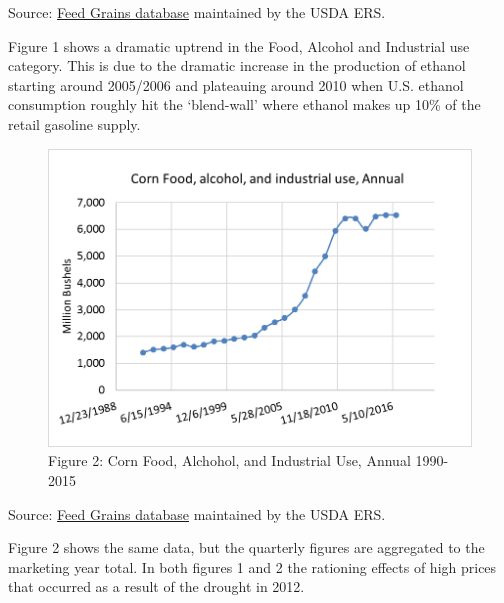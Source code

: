 \documentclass[]{book}
\theoremstyle{definition}
\theoremstyle{definition}
\theoremstyle{remark}
\begin{document}
Source:
\href{http://www.ers.usda.gov/data-products/feed-grains-database/feed-grains-yearbook-tables.aspx\#26780}{Feed
Grains database} maintained by the USDA ERS.

Figure 1 shows a dramatic uptrend in the Food, Alcohol and Industrial
use category. This is due to the dramatic increase in the production of
ethanol starting around 2005/2006 and plateauing around 2010 when U.S.
ethanol consumption roughly hit the `blend-wall' where ethanol makes up
10\% of the retail gasoline supply.

\begin{figure}[htbp]
\centering
\includegraphics{Excel-files/IntroductiontoCommodityTS-FeedGrains_Corn_files/image001.png}
\caption{Figure 2: Corn Food, Alchohol, and Industrial Use, Annual
1990-2015}
\end{figure}

Source:
\href{http://www.ers.usda.gov/data-products/feed-grains-database/feed-grains-yearbook-tables.aspx\#26780}{Feed
Grains database} maintained by the USDA ERS.

Figure 2 shows the same data, but the quarterly figures are aggregated
to the marketing year total. In both figures 1 and 2 the rationing
effects of high prices that occurred as a result of the drought in 2012.
\end{document}
